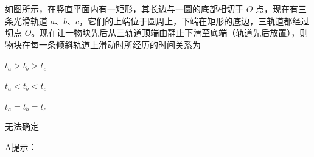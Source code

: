 如图所示，在竖直平面内有一矩形，其长边与一圆的底部相切于 \(O\) 点，现在有三条光滑轨道 \(a\)、\(b\)、\(c\)，它们的上端位于圆周上，下端在矩形的底边，三轨道都经过切点 \(O\)。现在让一物块先后从三轨道顶端由静止下滑至底端（轨道先后放置），则物块在每一条倾斜轨道上滑动时所经历的时间关系为\paren[]
	
\begin{choices}
	\item \(t_a > t_b > t_c\)
	\item \(t_a < t_b < t_c\)
	\item \(t_a = t_b = t_c\)
	\item 无法确定
\end{choices}
\begin{answer}
    A\qquad 提示：
\end{answer}